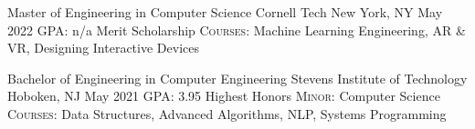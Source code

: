 

\begin{cventries}

  \cventry
  {Master of Engineering in Computer Science} %
  {Cornell Tech} %
  {New York, NY} %
  {May 2022} %
  {
  \textsc{GPA:} n/a {\enskip\cdotp\enskip} Merit Scholarship
  {\enskip\cdotp\enskip} \textsc{Courses:} Machine Learning Engineering, AR \& VR, Designing Interactive Devices
  }

  \cventry
  {Bachelor of Engineering in Computer Engineering} %
  {Stevens Institute of Technology} %
  {Hoboken, NJ} %
  {May 2021} %
  {
    \textsc{GPA:} 3.95 {\enskip\cdotp\enskip}
    Highest Honors {\enskip\cdotp\enskip}
    \textsc{Minor:} Computer Science {\enskip\cdotp\enskip}
    \textsc{Courses:} Data Structures, Advanced Algorithms, NLP, Systems Programming
  }

\end{cventries}
